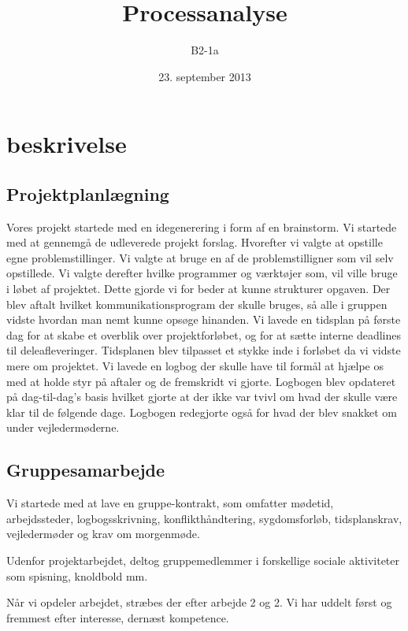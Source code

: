 


\title{Processanalyse}
\author{B2-1a}
\date{23. september 2013}
\maketitle



\section{beskrivelse}

\subsection{Projektplanlægning}

Vores projekt startede med en idegenerering i form af en brainstorm. Vi startede med at gennemgå de udleverede projekt forslag. Hvorefter vi valgte at opstille egne problemstillinger. Vi valgte at bruge en af de problemstilligner som vil selv opstillede. 
Vi valgte derefter hvilke programmer og værktøjer som, vil ville bruge i løbet af projektet. Dette gjorde vi for beder at kunne strukturer opgaven.  Der blev aftalt hvilket kommunikationsprogram der skulle bruges, så alle i gruppen vidste hvordan man nemt kunne opsøge hinanden. 
Vi lavede en tidsplan på første dag for at skabe et overblik over projektforløbet, og for at sætte interne deadlines til deleafleveringer. Tidsplanen blev tilpasset et stykke inde i forløbet da vi vidste mere om projektet.
Vi lavede en logbog der skulle have til formål at hjælpe os med at holde styr på aftaler og de fremskridt vi gjorte. Logbogen blev opdateret på dag-til-dag’s basis hvilket gjorte at der ikke var tvivl om hvad der skulle være klar til de følgende dage. Logbogen redegjorte også for hvad der blev snakket om under vejledermøderne. 


\subsection{Gruppesamarbejde}


Vi startede med at lave en gruppe-kontrakt, som omfatter mødetid, arbejdssteder, logbogsskrivning, konflikthåndtering, sygdomsforløb, tidsplanskrav, vejledermøder og krav om morgenmøde.

Udenfor projektarbejdet, deltog gruppemedlemmer i forskellige sociale aktiviteter som spisning, knoldbold mm.

Når vi opdeler arbejdet, stræbes der efter arbejde 2 og 2. Vi har uddelt først og fremmest efter interesse, dernæst kompetence.

